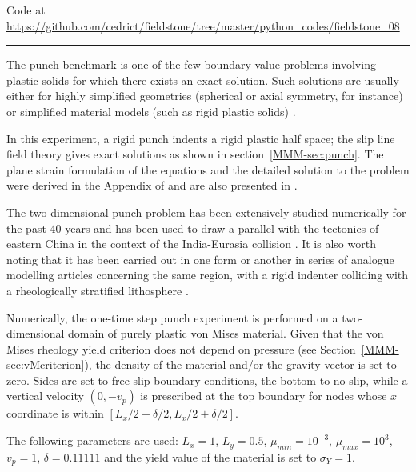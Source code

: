 

\begin{center}
Code at \url{https://github.com/cedrict/fieldstone/tree/master/python_codes/fieldstone_08}
\end{center}

\par\noindent\rule{\textwidth}{0.4pt}

The punch benchmark is one of the few boundary value problems involving plastic solids for which there exists an exact solution. 
Such solutions are usually either for highly simplified geometries (spherical or axial symmetry, for instance) or simplified material models (such as rigid plastic solids) \cite{kacha04}.

In this experiment, a rigid punch indents a rigid plastic half space; the slip line field theory gives 
exact solutions as shown in section~\ref{MMM-sec:punch}. 
The plane strain formulation of the equations and the detailed solution to the problem were derived in the Appendix of \cite{thfb08} and are also presented in \cite{gepd98}.

The two dimensional punch problem has been extensively studied numerically for the past 40 years 
\cite{zihl75,zihp95,chpe01,chan99,huhy99,yuti06,bufs08,raab07} and has been used to draw a parallel 
with the tectonics of eastern China in the context of the 
India-Eurasia collision \cite{tamo76,mota77}.
It is also worth noting that it has been carried out in one form or another in series of 
analogue modelling articles 
concerning the same region, with a rigid indenter colliding with a rheologically stratified 
lithosphere \cite{peta88,daco88,jodc90}.
 
Numerically, the one-time step punch experiment is performed on a two-dimensional
domain of purely plastic von Mises material. 
Given that the von Mises rheology yield criterion does not depend on pressure
(see Section~\ref{MMM-sec:vMcriterion}), the density of the material and/or the gravity 
vector is set to zero. Sides are set to free slip boundary conditions, the bottom to no slip, 
while a vertical velocity $(0,-v_p)$ is prescribed at the top boundary for nodes 
whose $x$ coordinate is within $[L_x/2-\delta/2,L_x/2+\delta/2]$. 

The following parameters are used: $L_x=1$, $L_y=0.5$, $\mu_{min}=10^{-3}$, 
$\mu_{max}=10^3$, $v_p=1$, $\delta=0.11111$ 
and the yield value of the material is set to $\sigma_Y=1$. 


